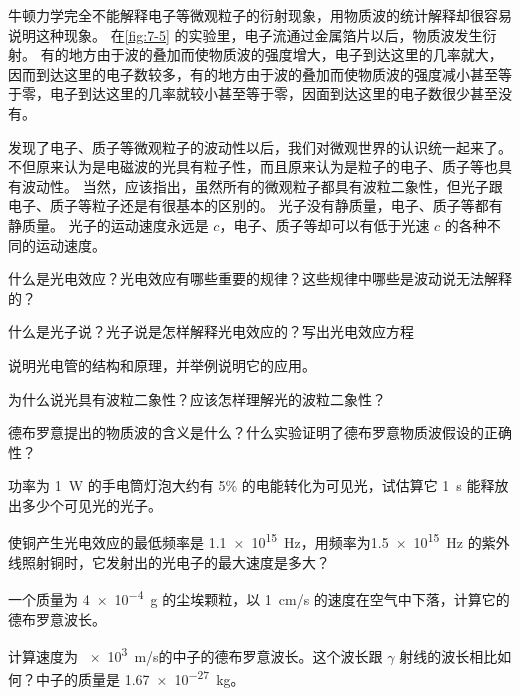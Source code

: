 牛顿力学完全不能解释电子等微观粒子的衍射现象，用物质波的统计解释却很容易说明这种现象。
在\cref{fig:7-5} 的实验里，电子流通过金属箔片以后，物质波发生衍射。
有的地方由于波的叠加而使物质波的强度增大，电子到达这里的几率就大，因而到达这里的电子数较多，有的地方由于波的叠加而使物质波的强度减小甚至等于零，电子到达这里的几率就较小甚至等于零，因面到达这里的电子数很少甚至没有。

发现了电子、质子等微观粒子的波动性以后，我们对微观世界的认识统一起来了。
不但原来认为是电磁波的光具有粒子性，而且原来认为是粒子的电子、质子等也具有波动性。
当然，应该指出，虽然所有的微观粒子都具有波粒二象性，但光子跟电子、质子等粒子还是有很基本的区别的。
光子没有静质量，电子、质子等都有静质量。
光子的运动速度永远是 $c$，电子、质子等却可以有低于光速 $c$ 的各种不同的运动速度。

\begin{Review}
\begin{question}
  \item 什么是光电效应？光电效应有哪些重要的规律？这些规律中哪些是波动说无法解释的？
  \item 什么是光子说？光子说是怎样解释光电效应的？写出光电效应方程
  \item 说明光电管的结构和原理，并举例说明它的应用。
  \item 为什么说光具有波粒二象性？应该怎样理解光的波粒二象性？
  \item 德布罗意提出的物质波的含义是什么？什么实验证明了德布罗意物质波假设的正确性？
\end{question}
\end{Review}

\begin{Exercise}
\begin{question}
  \item 功率为 \qty{1}{W} 的手电筒灯泡大约有 5\% 的电能转化为可见光，试估算它 \qty{1}{s} 能释放出多少个可见光的光子。
  \item 使铜产生光电效应的最低频率是 \qty{1.1e15}{Hz}，用频率为\qty{1.5e15}{Hz} 的紫外线照射铜时，它发射出的光电子的最大速度是多大？
  \item 一个质量为 \qty{4e-4}{g} 的尘埃颗粒，以 \qty{1}{cm/s} 的速度在空气中下落，计算它的德布罗意波长。
  \item 计算速度为 \qty{e3}{m/s}的中子的德布罗意波长。这个波长跟 $\gamma$ 射线的波长相比如何？中子的质量是 \qty{1.67e-27}{kg}。
\end{question}
\end{Exercise}
